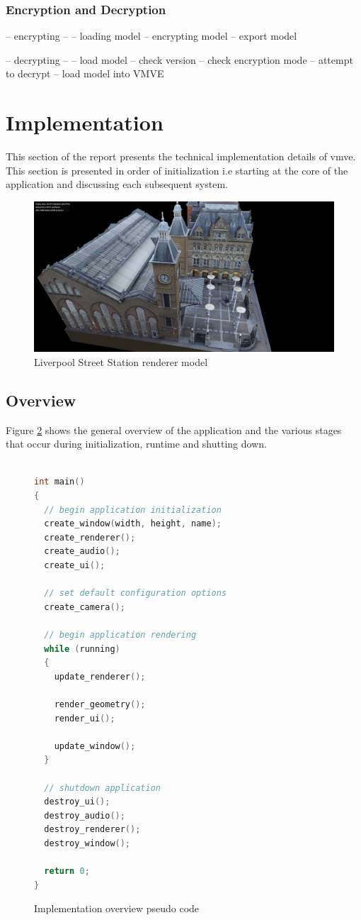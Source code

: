 \documentclass[11pt]{article}
\begin{document}
\subsubsection{Encryption and Decryption}
-- encrypting --
-- loading model
-- encrypting model
-- export model


-- decrypting --
-- load model 
-- check version
-- check encryption mode
-- attempt to decrypt
-- load model into VMVE

\section{Implementation}
This section of the report presents the technical implementation details of
\gls{vmve}. This section is presented in order of initialization i.e starting at
the core of the application and discussing each subsequent system.

\begin{figure}[h!]
  \centering
  \includegraphics[width=\textwidth]{images/rendering.png}
  \caption{Liverpool Street Station renderer model}
  \label{fig:renderer}
\end{figure}


\subsection{Overview}
Figure \ref{fig:overview_pseudo_code} shows the general overview of the application and the various 
stages that occur during initialization, runtime and shutting down.


\begin{figure}[ht]
\centering
\begin{lstlisting}[language=C++]

int main()
{
  // begin application initialization
  create_window(width, height, name);
  create_renderer();
  create_audio();
  create_ui();

  // set default configuration options
  create_camera();
  
  // begin application rendering
  while (running)
  {
    update_renderer();

    render_geometry();
    render_ui();

    update_window();
  }

  // shutdown application
  destroy_ui();
  destroy_audio();
  destroy_renderer();
  destroy_window();

  return 0;
}
\end{lstlisting}
\caption{Implementation overview pseudo code}
\label{fig:overview_pseudo_code}
\end{figure}
\end{document}
